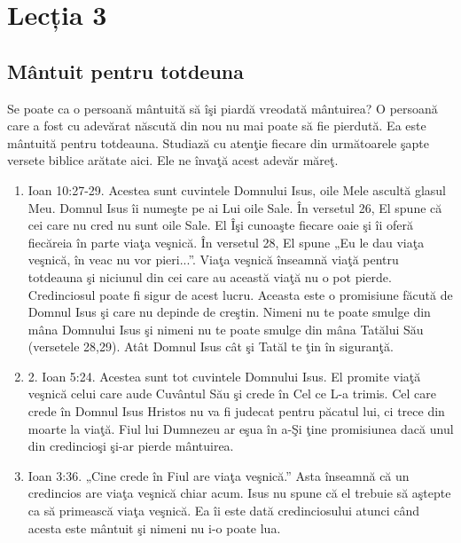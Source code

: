 \newpage

\section*{Lecția 3}

\subsection*{Mântuit pentru totdeuna}

Se poate ca o persoană mântuită să îşi piardă vreodată mântuirea? O persoană care a fost cu adevărat născută din nou nu mai poate să fie pierdută. Ea este mântuită pentru totdeauna. Studiază cu atenţie fiecare din următoarele şapte versete biblice arătate aici. Ele ne învaţă acest adevăr măreţ.

\begin{enumerate}

	\item Ioan 10:27-29. Acestea sunt cuvintele Domnului Isus, oile Mele ascultă glasul Meu. Domnul Isus îi numeşte pe ai Lui oile Sale. În versetul 26, El spune că cei care nu cred nu sunt oile Sale. El Îşi cunoaşte fiecare oaie şi îi oferă fiecăreia în parte viaţa veşnică. În versetul 28, El spune „Eu le dau viaţa veşnică, în veac nu vor pieri...”. Viaţa veşnică înseamnă viaţă pentru totdeauna şi niciunul din cei care au această viaţă nu o pot pierde. Credinciosul poate fi sigur de acest lucru. Aceasta este o promisiune făcută de Domnul Isus şi care nu depinde de creştin. Nimeni nu te poate smulge din mâna Domnului Isus şi nimeni nu te poate smulge din mâna Tatălui Său (versetele 28,29). Atât Domnul Isus cât şi Tatăl te ţin în siguranţă.
	
	\item 2.	Ioan 5:24. Acestea sunt tot cuvintele Domnului Isus. El promite viaţă veşnică celui care aude Cuvântul Său şi crede în Cel ce L-a trimis. Cel care crede în Domnul Isus Hristos nu va fi judecat pentru păcatul lui, ci trece din moarte la viaţă. Fiul lui Dumnezeu ar eşua în a-Şi ţine promisiunea dacă unul din credincioşi şi-ar pierde mântuirea.
	
	\item Ioan 3:36. „Cine crede în Fiul are viaţa veşnică.” Asta înseamnă că un credincios are viaţa veşnică chiar acum. Isus nu spune că el trebuie să aştepte ca să primească viaţa veşnică. Ea îi este dată credinciosului atunci când acesta este mântuit şi nimeni nu i-o poate lua.
	

\end{enumerate}
